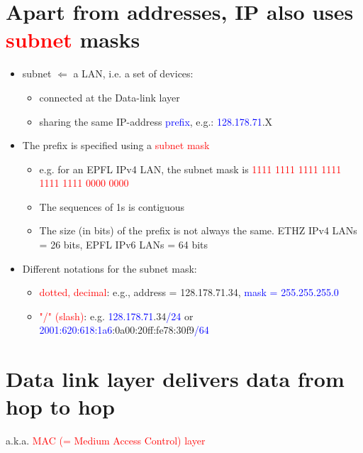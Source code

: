 \documentclass[11pt]{article}
\begin{document}
\section*{Apart from addresses, IP also uses \textcolor{red}{subnet} masks}

\begin{itemize}
	\item subnet $\Leftarrow$ a LAN, i.e. a set of devices: 
	\begin{itemize}
		\item connected at the Data-link layer
		\item sharing the same IP-address \textcolor{blue}{prefix}, e.g.: \textcolor{blue}{128.178.71}.X
	\end{itemize}
\end{itemize}

\begin{itemize}
	\item The prefix is specified using a \textcolor{red}{subnet mask}
	\begin{itemize}
		\item e.g. for an EPFL IPv4 LAN, the subnet mask is \textcolor{red}{1111 1111 1111 1111 1111 1111 0000 0000}
		\item The sequences of 1s is contiguous
		\item The size (in bits) of the prefix is not always the same. ETHZ IPv4 LANs = 26 bits, EPFL IPv6 LANs = 64 bits
	\end{itemize}
\end{itemize}

\begin{itemize}
	\item Different notations for the subnet mask:
	\begin{itemize}
		\item \textcolor{red}{dotted, decimal}: e.g., address = 128.178.71.34, \textcolor{blue}{mask = 255.255.255.0}
		\item \textcolor{red}{"/" (slash)}: e.g. \textcolor{blue}{128.178.71}.34\textcolor{blue}{/24} or \textcolor{blue}{2001:620:618:1a6}:0a00:20ff:fe78:30f9\textcolor{blue}{/64}
	\end{itemize}
\end{itemize}

\section*{Data link layer delivers data from hop to hop}

a.k.a. \textcolor{red}{MAC (= Medium Access Control) layer}
\end{document}
